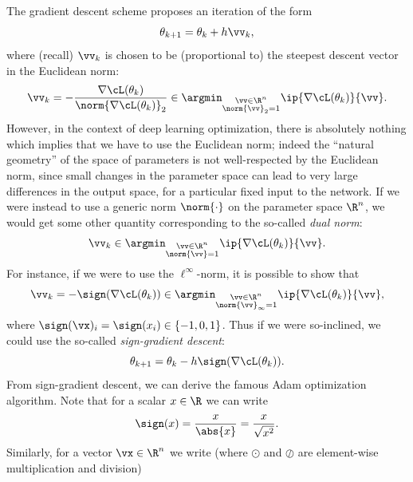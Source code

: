 \documentclass[../../book-main.tex]{subfiles}
\begin{document}
The gradient descent scheme proposes an iteration of the form 
\begin{equation}
    \theta_{k + 1} = \theta_{k} + h\vv_{k},
\end{equation}
where (recall) \(\vv_{k}\) is chosen to be (proportional to) the steepest descent vector in the Euclidean norm:
\begin{equation}
    \vv_{k} = -\frac{\nabla \cL(\theta_{k})}{\norm{\nabla \cL(\theta_{k})}_{2}} \in \argmin_{\substack{\vv \in \R^{n} \\ \norm{\vv}_{2} = 1}}\ip{\nabla \cL(\theta_{k})}{\vv}.
\end{equation}
However, in the context of deep learning optimization, there is absolutely nothing which implies that we have to use the Euclidean norm; indeed the ``natural geometry'' of the space of parameters is not well-respected by the Euclidean norm, since small changes in the parameter space can lead to very large differences in the output space, for a particular fixed input to the network. If we were instead to use a generic norm \(\norm{\cdot}\) on the parameter space \(\R^{n}\), we would get some other quantity corresponding to the so-called \textit{dual norm}:
\begin{equation}
    \vv_{k} \in \argmin_{\substack{\vv \in \R^{n} \\ \norm{\vv} = 1}}\ip{\nabla \cL(\theta_{k})}{\vv}.
\end{equation}
For instance, if we were to use the \(\ell^{\infty}\)-norm, it is possible to show that 
\begin{equation}
    \vv_{k} = -\sign(\nabla \cL(\theta_{k})) \in \argmin_{\substack{\vv \in \R^{n} \\ \norm{\vv}_{\infty} = 1}}\ip{\nabla \cL(\theta_{k})}{\vv},
\end{equation}
where \(\sign(\vx)_{i} = \sign(x_{i}) \in \{-1, 0, 1\}\). Thus if we were so-inclined, we could use the so-called \textit{sign-gradient descent}:
\begin{equation}\label{eq:sign_gradient_descent}
    \theta_{k + 1} = \theta_{k} - h\sign(\nabla \cL(\theta_{k})).
\end{equation}
From sign-gradient descent, we can derive the famous Adam optimization algorithm. Note that for a scalar \(x \in \R\) we can write
\begin{equation}
    \sign(x) = \frac{x}{\abs{x}} = \frac{x}{\sqrt{x^{2}}}.
\end{equation}
Similarly, for a vector \(\vx \in \R^{n}\) we write (where \(\odot\) and \(\oslash\) are element-wise multiplication and division)
\end{document}
